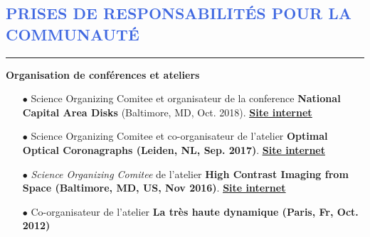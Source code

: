 \documentclass[11pt, a4paper, french]{article}
\begin{document}
\lfoot{}


\vspace{-0.3cm}
\textcolor{RoyalBlue}{\section{\large PRISES DE RESPONSABILITÉS POUR LA COMMUNAUTÉ}
\vspace{-0.2cm}\hrule}
\vspace{0.4cm}

\textbf{Organisation de conférences et ateliers}\\
\vspace{-0.1cm}
\begin{itemize} \itemsep 5pt
    \item[$\bullet$] \small Science Organizing Comitee et organisateur de la conference  \textbf{National Capital Area Disks} (Baltimore, MD, Oct. 2018). \href{https://sites.google.com/view/ncad7-at-jhu/ncad7}{\underline{\textbf{Site internet}}}
    \item[$\bullet$] \small Science Organizing Comitee et co-organisateur de l'atelier \textbf{Optimal Optical Coronagraphs (Leiden, NL, Sep. 2017)}. \href{https://www.lorentzcenter.nl/lc/web/2017/924/info.php3?wsid=924&venue=Snellius}{\underline{\textbf{Site internet}}}
    \item[$\bullet$] \small \textit{Science Organizing Comitee} de l'atelier \textbf{High Contrast Imaging from Space (Baltimore, MD, US, Nov 2016)}.  \href{http://www.cvent.com/events/high-contrast-imaging-in-space-workshop/event-summary-eb3bb6bd54a342c5a15678daa49be683.aspx}{\underline{\textbf{Site internet}}}
    \item[$\bullet$] \small Co-organisateur de l'atelier \textbf{La très haute dynamique (Paris, Fr, Oct. 2012)}
\end{itemize}
\vspace{0.4cm}
\end{document}
